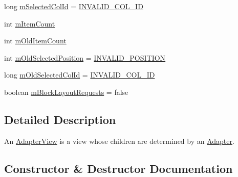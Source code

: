 \begin{DoxyCompactItemize}
\item 
long \hyperlink{classit_1_1sephiroth_1_1android_1_1library_1_1widget_1_1_adapter_view_a9addfad5bab6ddbeb0b02b55894ee34b}{m\+Selected\+Col\+Id} = \hyperlink{classit_1_1sephiroth_1_1android_1_1library_1_1widget_1_1_adapter_view_a4652ef84c3de9de7d3697a29e2bb96c6}{I\+N\+V\+A\+L\+I\+D\+\_\+\+C\+O\+L\+\_\+\+ID}
\item 
int \hyperlink{classit_1_1sephiroth_1_1android_1_1library_1_1widget_1_1_adapter_view_a8768a394cf831857939f70ea3f46de7f}{m\+Item\+Count}
\item 
int \hyperlink{classit_1_1sephiroth_1_1android_1_1library_1_1widget_1_1_adapter_view_a46fc9b842085b37342496116ae383497}{m\+Old\+Item\+Count}
\item 
int \hyperlink{classit_1_1sephiroth_1_1android_1_1library_1_1widget_1_1_adapter_view_acb0769dc21345a039a2d9481dd57c26f}{m\+Old\+Selected\+Position} = \hyperlink{classit_1_1sephiroth_1_1android_1_1library_1_1widget_1_1_adapter_view_a2751b7d592638baeaf149f6da0d4e598}{I\+N\+V\+A\+L\+I\+D\+\_\+\+P\+O\+S\+I\+T\+I\+ON}
\item 
long \hyperlink{classit_1_1sephiroth_1_1android_1_1library_1_1widget_1_1_adapter_view_ae014e28abccce170b11d466bcddc1d7c}{m\+Old\+Selected\+Col\+Id} = \hyperlink{classit_1_1sephiroth_1_1android_1_1library_1_1widget_1_1_adapter_view_a4652ef84c3de9de7d3697a29e2bb96c6}{I\+N\+V\+A\+L\+I\+D\+\_\+\+C\+O\+L\+\_\+\+ID}
\item 
boolean \hyperlink{classit_1_1sephiroth_1_1android_1_1library_1_1widget_1_1_adapter_view_a6cfb0ccf10bbe9465452fd1494fc5304}{m\+Block\+Layout\+Requests} = false
\end{DoxyCompactItemize}


\subsection{Detailed Description}
An \hyperlink{classit_1_1sephiroth_1_1android_1_1library_1_1widget_1_1_adapter_view}{Adapter\+View} is a view whose children are determined by an \hyperlink{}{Adapter}. 

\subsection{Constructor \& Destructor Documentation}
\mbox{\label{classit_1_1sephiroth_1_1android_1_1library_1_1widget_1_1_adapter_view_ad4acc384876541187b4ac3ae970ec1c9}} 
